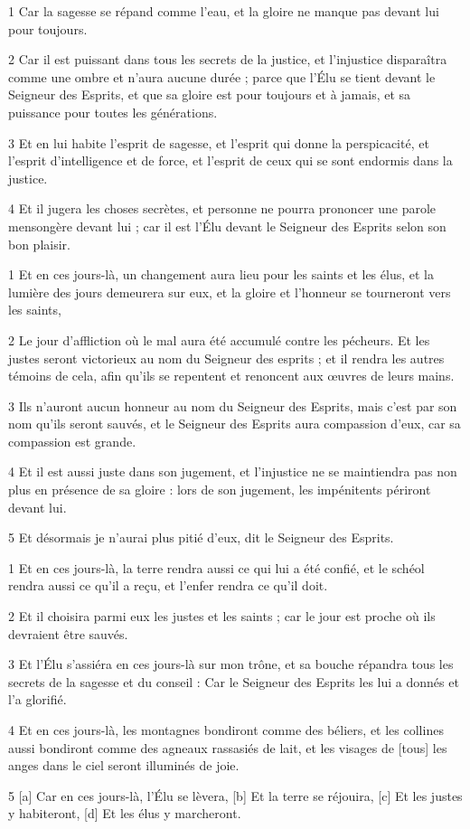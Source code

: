 \par 1 Car la sagesse se répand comme l'eau, et la gloire ne manque pas devant lui pour toujours.
\par 2 Car il est puissant dans tous les secrets de la justice, et l'injustice disparaîtra comme une ombre et n'aura aucune durée ; parce que l'Élu se tient devant le Seigneur des Esprits, et que sa gloire est pour toujours et à jamais, et sa puissance pour toutes les générations.
\par 3 Et en lui habite l'esprit de sagesse, et l'esprit qui donne la perspicacité, et l'esprit d'intelligence et de force, et l'esprit de ceux qui se sont endormis dans la justice.
\par 4 Et il jugera les choses secrètes, et personne ne pourra prononcer une parole mensongère devant lui ; car il est l'Élu devant le Seigneur des Esprits selon son bon plaisir.


\par 1 Et en ces jours-là, un changement aura lieu pour les saints et les élus, et la lumière des jours demeurera sur eux, et la gloire et l'honneur se tourneront vers les saints,
\par 2 Le jour d'affliction où le mal aura été accumulé contre les pécheurs. Et les justes seront victorieux au nom du Seigneur des esprits ; et il rendra les autres témoins de cela, afin qu'ils se repentent et renoncent aux œuvres de leurs mains.
\par 3 Ils n'auront aucun honneur au nom du Seigneur des Esprits, mais c'est par son nom qu'ils seront sauvés, et le Seigneur des Esprits aura compassion d'eux, car sa compassion est grande.
\par 4 Et il est aussi juste dans son jugement, et l'injustice ne se maintiendra pas non plus en présence de sa gloire : lors de son jugement, les impénitents périront devant lui.
\par 5 Et désormais je n'aurai plus pitié d'eux, dit le Seigneur des Esprits.


\par 1 Et en ces jours-là, la terre rendra aussi ce qui lui a été confié, et le schéol rendra aussi ce qu'il a reçu, et l'enfer rendra ce qu'il doit.
\par 2 Et il choisira parmi eux les justes et les saints ; car le jour est proche où ils devraient être sauvés.
\par 3 Et l'Élu s'assiéra en ces jours-là sur mon trône, et sa bouche répandra tous les secrets de la sagesse et du conseil : Car le Seigneur des Esprits les lui a donnés et l'a glorifié.
\par 4 Et en ces jours-là, les montagnes bondiront comme des béliers, et les collines aussi bondiront comme des agneaux rassasiés de lait, et les visages de [tous] les anges dans le ciel seront illuminés de joie.
\par 5 [a] Car en ces jours-là, l'Élu se lèvera, [b] Et la terre se réjouira, [c] Et les justes y habiteront, [d] Et les élus y marcheront.


